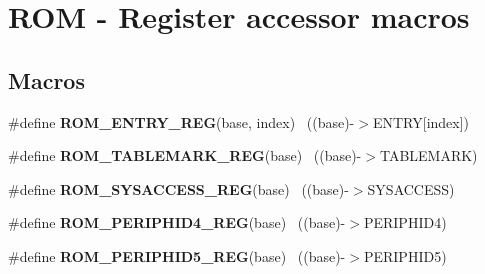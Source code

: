 \hypertarget{group___r_o_m___register___accessor___macros}{}\section{R\+O\+M -\/ Register accessor macros}
\label{group___r_o_m___register___accessor___macros}
\subsection*{Macros}
\begin{DoxyCompactItemize}
\item 
\hypertarget{group___r_o_m___register___accessor___macros_gaa621177d86d2cbf2946deff1d6b18d97}{}\#define {\bfseries R\+O\+M\+\_\+\+E\+N\+T\+R\+Y\+\_\+\+R\+E\+G}(base,  index)                            ~((base)-\/$>$E\+N\+T\+R\+Y\mbox{[}index\mbox{]})\label{group___r_o_m___register___accessor___macros_gaa621177d86d2cbf2946deff1d6b18d97}

\item 
\hypertarget{group___r_o_m___register___accessor___macros_gae38a845f1b34c61dcea35cd3ebf86301}{}\#define {\bfseries R\+O\+M\+\_\+\+T\+A\+B\+L\+E\+M\+A\+R\+K\+\_\+\+R\+E\+G}(base)                                ~((base)-\/$>$T\+A\+B\+L\+E\+M\+A\+R\+K)\label{group___r_o_m___register___accessor___macros_gae38a845f1b34c61dcea35cd3ebf86301}

\item 
\hypertarget{group___r_o_m___register___accessor___macros_gabd040aeef220d6d2233d09a72a385f21}{}\#define {\bfseries R\+O\+M\+\_\+\+S\+Y\+S\+A\+C\+C\+E\+S\+S\+\_\+\+R\+E\+G}(base)                                ~((base)-\/$>$S\+Y\+S\+A\+C\+C\+E\+S\+S)\label{group___r_o_m___register___accessor___macros_gabd040aeef220d6d2233d09a72a385f21}

\item 
\hypertarget{group___r_o_m___register___accessor___macros_ga83b2ccedaca218ab169a90049f73e11b}{}\#define {\bfseries R\+O\+M\+\_\+\+P\+E\+R\+I\+P\+H\+I\+D4\+\_\+\+R\+E\+G}(base)                                ~((base)-\/$>$P\+E\+R\+I\+P\+H\+I\+D4)\label{group___r_o_m___register___accessor___macros_ga83b2ccedaca218ab169a90049f73e11b}

\item 
\hypertarget{group___r_o_m___register___accessor___macros_gac221e36533218184b707e454afaaa359}{}\#define {\bfseries R\+O\+M\+\_\+\+P\+E\+R\+I\+P\+H\+I\+D5\+\_\+\+R\+E\+G}(base)                                ~((base)-\/$>$P\+E\+R\+I\+P\+H\+I\+D5)\label{group___r_o_m___register___accessor___macros_gac221e36533218184b707e454afaaa359}


\end{DoxyCompactItemize}
